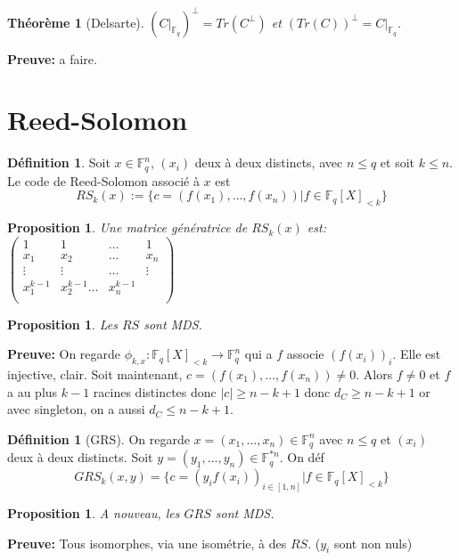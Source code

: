 \documentclass[12pt]{article}
\theoremstyle{plain}
\newtheorem{thm}[subsubsection]{Th\'eor\`eme}
\newtheorem{prop}[subsubsection]{Proposition}
\theoremstyle{definition}
\newtheorem{defn}[subsubsection]{D\'efinition}
\theoremstyle{remark}
\newcommand{\F}{\mathbb{F}}
\begin{document}
\begin{thm}[Delsarte]
    $(C|_{\F_q})^{\perp}=Tr(C^{\perp})$ et $(Tr(C))^{\perp}=C|_{\F_q}$.
\end{thm}
\textbf{Preuve:} a faire.

\section{Reed-Solomon}
\begin{defn}
    Soit $x\in \F_q^n$, $(x_i)$ deux à deux distincts, avec $n\leq q$ et soit $k\leq n$.
    Le code de Reed-Solomon associé à $x$ est 
    \[RS_k(x):=\{c=(f(x_1),\ldots,f(x_n))|f\in \F_q[X]_{<k}\}\]
\end{defn}
\begin{prop}
    Une matrice génératrice de $RS_k(x)$ est:
    $\begin{pmatrix}
        1 & 1&\ldots&1\\
        x_1&x_2&\ldots&x_n\\
        \vdots&\vdots&\ldots&\vdots\\
        x_1^{k-1} & x_2^{k-1}\ldots&x_n^{k-1}\\
    \end{pmatrix}$
\end{prop}

\begin{prop}
    Les $RS$ sont MDS.
\end{prop}
\textbf{Preuve:} On regarde $\phi_{k,x}:\F_q[X]_{<k}\to \F_q^n$ qui 
a $f$ associe $(f(x_i))_i$. Elle est injective, clair. 
Soit maintenant, $c=(f(x_1),\ldots,f(x_n))\ne 0$. Alors $f\ne 0$ et 
$f$ a au plus $k-1$ racines distinctes donc $|c|\geq n-k+1$ donc 
$d_C\geq n-k+1$ or avec singleton, on a aussi $d_C\leq n-k+1$.
\begin{defn}[GRS]
    On regarde $x=(x_1,\ldots, x_n)\in \F_q^n$ avec $n\leq q$
    et $(x_i)$ deux à deux distincts. Soit $y=(y_1,\ldots, y_n)\in\F_q^{*n}$.
    On déf \[GRS_k(x,y)=\{c=(y_if(x_i))_{i\in [1,n]}|f\in \F_q[X]_{<k}\}\]
\end{defn}
\begin{prop}
    A nouveau, les $GRS$ sont MDS.
\end{prop}
\textbf{Preuve:} Tous isomorphes, via une isométrie, à des $RS$. ($y_i$ sont non nuls)
\end{document}
